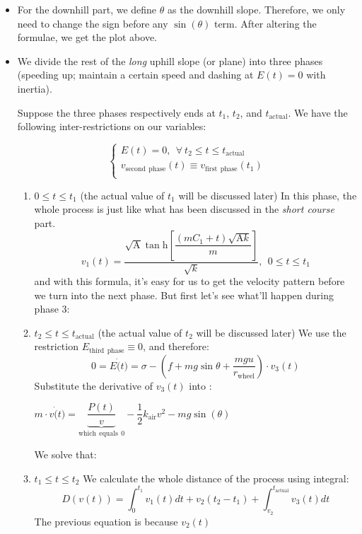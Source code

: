 \documentclass[12pt]{article}
\theoremstyle{definition}
\theoremstyle{remark}
\numberwithin{equation}{section}
\begin{document}
	\begin{itemize}
		\item For the downhill part, we define \(\theta\) as the downhill slope. Therefore, we only need to change the sign before any \(\sin\left(\theta\right)\) term. After altering the formulae, we get the plot above.
		\item We divide the rest of the \textit{long} uphill slope (or plane) into three phases (speeding up; maintain a certain speed and dashing at \(E(t)=0\) with inertia).

			Suppose the three phases respectively ends at \(t_1\), \(t_2\), and \(t_{\mathrm{actual}}\). We have the following inter-restrictions on our variables:

			$$
			\begin{cases}
				E \left( t \right) =0,\:\:\forall \:t_2\le t\le t_{\mathrm{actual}}\\
				v_{\mathrm{second}\:\:\mathrm{phase}}\left( t \right) \equiv v_{\mathrm{first}\:\:\mathrm{phase}}\left( t_1 \right)\\
			\end{cases}
			$$
			\begin{enumerate}
				\item \(0\leq t\leq t_1\) (the actual value of \(t_1\) will be discussed later)
					In this phase, the whole process is just like what has been discussed in the \textit{short course} part.
					\[v_1(t)=\dfrac{\sqrt{\mathrm{A}} \tan \mathrm{h}\left[\dfrac{\left(m C _1+t\right)\sqrt{\mathrm{A}k}}{m}\right]}{\sqrt{ k }},\:\:0\leq t\leq t_1\]
					and with this formula, it's easy for us to get the velocity pattern before we turn into the next phase. But first let's see what'll happen during phase 3:
				\item \(t_2\leq t\leq t_{\mathrm{actual}}\) (the actual value of \(t_2\) will be discussed later)
					We use the restriction \(E_{\mathrm{third\:\:phase}}\equiv 0\), and therefore:
					\[0=E \dot(t)=\sigma-\left(f+mg\sin\theta+\dfrac{mgu}{r_{\mathrm{wheel}}}\right)\cdot v_3(t)\]
					Substitute the derivative of \(v_3(t)\) into :

					\(m \cdot v\dot(t)=\underset{\mathrm{which\:\:equals\:\:}0}{\underbrace{\dfrac{P (t)}{v}}}-\dfrac{1}{2} k_{\mathrm{air}} v^2-mg\sin\left(\theta\right)\)

					We solve that:

				\item \(t_1\leq t\leq t_2\)
					We calculate the whole distance of the process using integral:
					\[D(v(t))=\int_0^{t_1}v_1(t)dt+v_2(t_2-t_1)+\int_{v_2}^{t_{\mathrm{actual}}}v_3(t)dt\]
					The previous equation is because \(v_2(t)\)

			\end{enumerate}
	\end{itemize}
\end{document}
